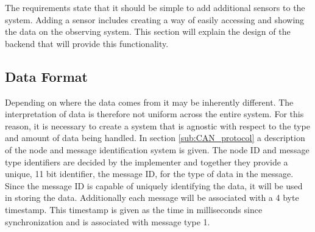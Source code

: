 The requirements state that it should be simple to add additional sensors to the system.
Adding a sensor includes creating a way of easily accessing and showing the data on the observing system.
This section will explain the design of the backend that will provide this functionality.

\subsection{Data Format}
Depending on where the data comes from it may be inherently different. 
The interpretation of data is therefore not uniform across the entire system.
For this reason, it is necessary to create a system that is agnostic with respect to the type and amount of data being handled.
In section \ref{sub:CAN_protocol} a description of the node and message identification system is given.
The node ID and message type identifiers are decided by the implementer and together they provide a unique, 11 bit identifier, the message ID, for the type of data in the message.
Since the message ID is capable of uniquely identifying the data, it will be used in storing the data.
Additionally each message will be associated with a 4 byte timestamp.
This timestamp is given as the time in milliseconds since synchronization and is associated with message type 1.

